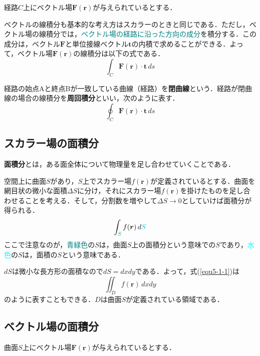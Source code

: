 経路$C$上にベクトル場$\bm{F}(\bm{r})$が与えられているとする．

ベクトルの線積分も基本的な考え方はスカラーのときと同じである．ただし，ベクトル場の線積分では，\textcolor{teal}{ベクトル場の経路に沿った方向の成分}を積分する．この成分は，ベクトル$\bm{F}$と単位接線ベクトル$\bm{t}$の内積で求めることができる．よって，ベクトル場$\bm{F}(\bm{r})$の線積分は以下の式である．
\begin{equation}
	\int_{C} \bm{F}(\bm{r}) \cdot \bm{t}\,ds
\end{equation}

経路の始点Aと終点Bが一致している曲線（経路）を\textbf{閉曲線}という．経路が閉曲線の場合の線積分を\textbf{周回積分}といい，次のように表す．
\begin{equation}
	\oint_{C} \bm{F}(\bm{r}) \cdot \bm{t}\,ds
\end{equation}



\subsection{スカラー場の面積分}

\textbf{面積分}とは，ある面全体について物理量を足し合わせていくことである．

空間上に曲面$S$があり，$S$上でスカラー場$f(\bm{r})$が定義されているとする．曲面を網目状の微小な面積$\varDelta S$に分け，それにスカラー場$f(\bm{r})$を掛けたものを足し合わせることを考える．そして，分割数を増やして$\varDelta S \to 0$としていけば面積分が得られる．
\begin{equation}
	\int_{\color{teal}S} f(\bm{r})\,d{\color{cyan}S} \label{equ5-1-1}
\end{equation}
ここで注意なのが，\textcolor{teal}{青緑色}の$S$は，曲面$S$上の面積分という意味での$S$であり，\textcolor{cyan}{水色}の$S$は，面積の$S$という意味である．

$dS$は微小な長方形の面積なので$dS = dxdy$である．よって，式(\ref{equ5-1-1})は
\begin{equation}
	\iint_{D} f(\bm{r})\,dxdy
\end{equation}
のように表すこともできる．$D$は曲面$S$が定義されている領域である．



\subsection{ベクトル場の面積分}

曲面$S$上にベクトル場$\bm{F}(\bm{r})$が与えられているとする．

